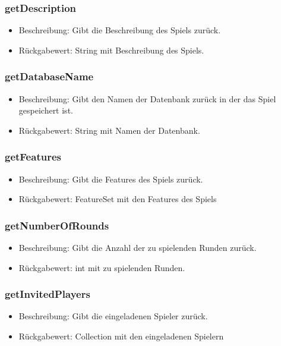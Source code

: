\documentclass[a4paper]{scrreprt}
\begin{document}
    \subsubsection{getDescription}
    \begin{itemize}
        \item Beschreibung: Gibt die Beschreibung des Spiels zurück.
        \item Rückgabewert: String mit Beschreibung des Spiels.
    \end{itemize}

    \subsubsection{getDatabaseName}
    \begin{itemize}
        \item Beschreibung: Gibt den Namen der Datenbank zurück in der das Spiel gespeichert ist.
        \item Rückgabewert: String mit Namen der Datenbank.
    \end{itemize}

    \subsubsection{getFeatures}
    \begin{itemize}
        \item Beschreibung: Gibt die Features des Spiels zurück.
        \item Rückgabewert: FeatureSet mit den Features des Spiels
    \end{itemize}

    \subsubsection{getNumberOfRounds}
    \begin{itemize}
        \item Beschreibung: Gibt die Anzahl der zu spielenden Runden zurück.
        \item Rückgabewert: int mit zu spielenden Runden.
    \end{itemize}

    \subsubsection{getInvitedPlayers}
    \begin{itemize}
        \item Beschreibung: Gibt die eingeladenen Spieler zurück.
        \item Rückgabewert: Collection mit den eingeladenen Spielern
    \end{itemize}
\end{document}
